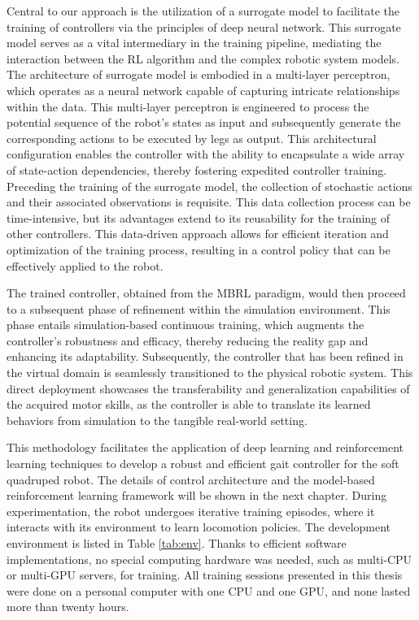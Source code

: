 Central to our approach is the utilization of a surrogate model to facilitate the training of controllers via the principles of deep neural network. This surrogate model serves as a vital intermediary in the training pipeline, mediating the interaction between the RL algorithm and the complex robotic system models. The architecture of surrogate model is embodied in a multi-layer perceptron, which operates as a neural network capable of capturing intricate relationships within the data. This multi-layer perceptron is engineered to process the potential sequence of the robot's states as input and subsequently generate the corresponding actions to be executed by legs as output. This architectural configuration enables the controller with the ability to encapsulate a wide array of state-action dependencies, thereby fostering expedited controller training. Preceding the training of the surrogate model, the collection of stochastic actions and their associated observations is requisite. This data collection process can be time-intensive, but its advantages extend to its reusability for the training of other controllers. This data-driven approach allows for efficient iteration and optimization of the training process, resulting in a control policy that can be effectively applied to the robot.

The trained controller, obtained from the \ac{MBRL} paradigm, would then proceed to a subsequent phase of refinement within the simulation environment. This phase entails simulation-based continuous training, which augments the controller's robustness and efficacy, thereby reducing the reality gap and enhancing its adaptability. Subsequently, the controller that has been refined in the virtual domain is seamlessly transitioned to the physical robotic system. This direct deployment showcases the transferability and generalization capabilities of the acquired motor skills, as the controller is able to translate its learned behaviors from simulation to the tangible real-world setting.

This methodology facilitates the application of deep learning and reinforcement learning techniques to develop a robust and efficient gait controller for the soft quadruped robot. The details of control architecture and the model-based reinforcement learning framework will be shown in the next chapter. During experimentation, the robot undergoes iterative training episodes, where it interacts with its environment to learn locomotion policies. The development environment is listed in Table \ref{tab:env}. Thanks to efficient software implementations, no special computing hardware was needed, such as multi-CPU or multi-GPU servers, for training. All training sessions presented in this thesis were done on a personal computer with one CPU and one GPU, and none lasted more than twenty hours. 


